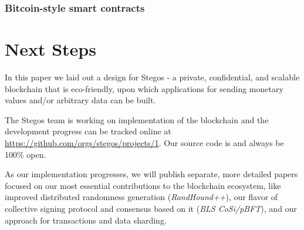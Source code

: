 \documentclass[a4paper, 10pt, conference]{ieeeconf}
\begin{document}
\subsubsection{Bitcoin-style smart contracts}\label{SmartContracts}

\section{Next Steps}

In this paper we laid out a design for Stegos - a private, confidential, and scalable blockchain that is eco-friendly, upon which applications for sending monetary values and/or arbitrary data can be built.

The Stegos team is working on implementation of the blockchain and the development progress can be tracked online at \url{https://github.com/orgs/stegos/projects/1}. Our source code is and always be 100\% open.

As our implementation progresses, we will publish separate, more detailed papers focused on our most essential contributions to the blockchain ecosystem, like improved distributed randomness generation (\textit{RandHound++}), our flavor of collective signing protocol and consensus based on it (\textit{BLS CoSi/pBFT}), and our approach for transactions and data sharding. 
\end{document}

